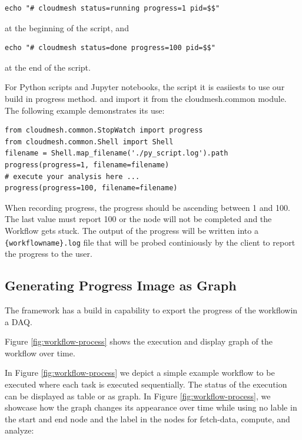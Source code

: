 \begin{verbatim}
echo "# cloudmesh status=running progress=1 pid=$$"
\end{verbatim}

at the beginning of the script, and

\begin{verbatim}
echo "# cloudmesh status=done progress=100 pid=$$"
\end{verbatim}

at the end of the script.

For Python scripts and Jupyter notebooks, the script it is easiiests
to use our build in progress method. and import it from the
cloudmesh.common module. The following example demonstrates its use:

\smallskip
\begin{verbatim}
from cloudmesh.common.StopWatch import progress
from cloudmesh.common.Shell import Shell
filename = Shell.map_filename('./py_script.log').path
progress(progress=1, filename=filename)
# execute your analysis here ...
progress(progress=100, filename=filename)
\end{verbatim}
\smallskip

When recording progress, the progress should be ascending between 1
and 100. The last value must report 100 or the node will not be
completed and the Workflow gets stuck.  The output of the progress
will be written into a \verb|{workflowname}.log| file that will be
probed continiously by the client to report the progress to the user.

\subsection{Generating Progress Image as Graph}

The framework has a build in capability to export the progress of the
workflowin a DAQ.

Figure \ref{fig:workflow-process} shows
the execution and display graph of the workflow
over time.


In Figure \ref{fig:workflow-process} we depict a simple example
workflow to be executed where each task is executed sequentially. The
status of the execution can be displayed as table or as graph. In
Figure \ref{fig:workflow-process}, we showcase how the graph changes
its appearance over time while using no lable in the start and end
node and the label in the nodes for fetch-data, compute, and analyze:

